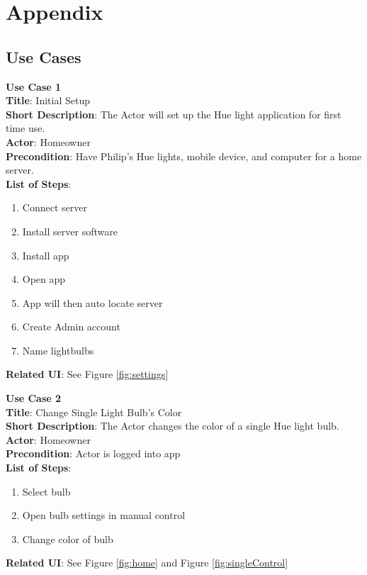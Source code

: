 \documentclass[12pt]{article}
\begin{document}
\clearpage



\section{Appendix}
\setcounter{figure}{0}
  \subsection{Use Cases}
  \begin{samepage}
  \begin{framed}
    \textbf{Use Case 1}\\
    \textbf{Title}: Initial Setup\\
    \textbf{Short Description}:  The Actor will set up the Hue light application for first time use.  \\
    \textbf{Actor}: Homeowner \\
    \textbf{Precondition}: Have Philip's Hue lights, mobile device, and computer for a home server. \\
    \textbf{List of Steps}:
    \begin{enumerate}
      \item Connect server
      \item Install server software
      \item Install app
      \item Open app
      \item App will then auto locate server
      \item Create Admin account
      \item Name lightbulbs
    \end{enumerate}
    \textbf{Related UI}: See Figure \ref{fig:settings} 
  \end{framed}
\end{samepage}

\begin{samepage}
  \begin{framed}
    \textbf{Use Case 2}\\
    \textbf{Title}: Change Single Light Bulb's Color\\
    \textbf{Short Description}: The Actor changes the color of a single Hue light bulb.\\
    \textbf{Actor}: Homeowner \\
    \textbf{Precondition}: Actor is logged into app \\
    \textbf{List of Steps}:
    \begin{enumerate}
      \item Select bulb
      \item Open bulb settings in manual control
      \item Change color of bulb
    \end{enumerate}
    \textbf{Related UI}:  See Figure \ref{fig:home} and Figure \ref{fig:singleControl} 
  \end{framed}
\end{samepage}
\end{document}
